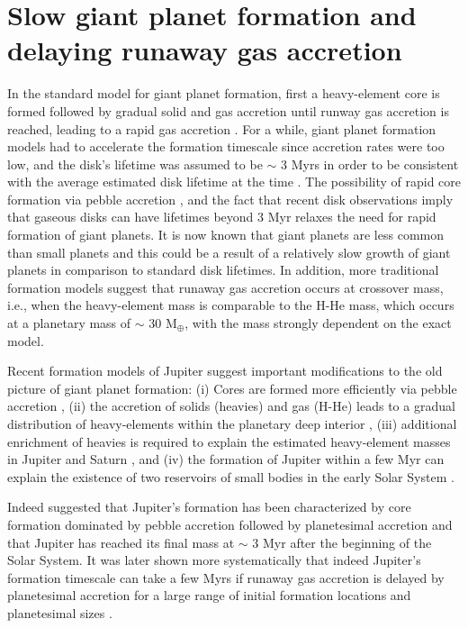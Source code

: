 \documentclass{aa}
\begin{document}
\section{Slow giant planet formation and delaying runaway gas accretion} 
In the standard model for giant planet formation, first a heavy-element core is formed followed by gradual solid and gas accretion until  runway gas accretion is reached, leading to a rapid gas accretion \citep{Pollack1996}. 
For a while, giant planet formation models had to accelerate the formation timescale since accretion rates were too low, and the disk's lifetime was assumed to be $\sim$ 3 Myrs \citep[e.g.,][]{2005A&A...434..343A,Movshovitz2010} in order to be consistent with the average estimated disk lifetime at the time \citep{2009AIPC.1158....3M}.  The possibility of rapid core formation via pebble accretion \citep{Lambrechts2014}, and the fact that recent disk observations imply that gaseous disks can have lifetimes beyond 3 Myr \citep[e.g.,][]{2021ApJ...921...72M} relaxes the need for rapid formation of giant planets. It is now known that giant planets are less common than small planets \citep[e.g.,][]{2021ApJS..255...14F} and this could be a result of a relatively slow growth of giant planets in comparison to standard disk lifetimes. 
In addition, more traditional formation models suggest that runaway gas accretion occurs at crossover mass, i.e., when the heavy-element mass is comparable to the H-He mass, which occurs at a planetary mass of $\sim$ 30 M$_{\oplus}$, with the mass strongly dependent on the exact model. 


Recent formation models of Jupiter suggest important modifications to the old picture of giant planet formation:
(i) Cores are formed more efficiently via pebble accretion \citep[e.g.,][]{Johansen2017}, (ii) the accretion of solids (heavies) and gas (H-He) leads to a gradual distribution of heavy-elements within the planetary deep interior \citep[e.g.][]{Lambrechts2014,2017ApJ...840L...4H},  (iii) additional enrichment of heavies is required to explain the estimated heavy-element masses in Jupiter and Saturn \citep[e.g.,][]{2010ApJ...720.1161L,Shibata2019,2022ApJ...926L..37S}, and (iv) the formation of Jupiter within a few Myr can explain the existence of two reservoirs of small bodies in the early Solar System \citep{2017PNAS..114.6712K}. 
\par 


Indeed \citet{2018NatAs...2..873A} suggested that Jupiter's formation has been characterized by core formation dominated by pebble accretion followed by planetesimal accretion and that Jupiter has reached its final mass at $\sim$ 3 Myr after the beginning of the Solar System. It was later shown more systematically that indeed Jupiter's formation timescale can take a few Myrs if runaway gas accretion is delayed by planetesimal accretion for a large range of initial formation locations and planetesimal sizes \citep{Venturini2020}. 
\par 
\end{document}
